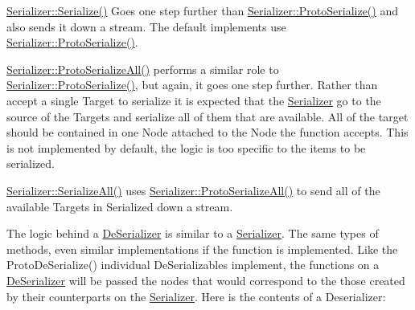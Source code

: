  \par
 \hyperlink{classMezzanine_1_1Serializer_af71f7716c36ba0a583ab1e29e08cac6d}{Serializer\-::\-Serialize()} Goes one step further than \hyperlink{classMezzanine_1_1Serializer_ae20b1167a26fe0d913c9123788d30657}{Serializer\-::\-Proto\-Serialize()} and also sends it down a stream. The default implements use \hyperlink{classMezzanine_1_1Serializer_ae20b1167a26fe0d913c9123788d30657}{Serializer\-::\-Proto\-Serialize()}. \par
 \par
 \hyperlink{classMezzanine_1_1Serializer_addec7bf46f6d1b149eaf3e449c5d8501}{Serializer\-::\-Proto\-Serialize\-All()} performs a similar role to \hyperlink{classMezzanine_1_1Serializer_ae20b1167a26fe0d913c9123788d30657}{Serializer\-::\-Proto\-Serialize()}, but again, it goes one step further. Rather than accept a single Target to serialize it is expected that the \hyperlink{classMezzanine_1_1Serializer}{Serializer} go to the source of the Targets and serialize all of them that are available. All of the target should be contained in one Node attached to the Node the function accepts. This is not implemented by default, the logic is too specific to the items to be serialized. \par
 \par
 \hyperlink{classMezzanine_1_1Serializer_aa178dfa519a2e73e84c0a2f35b2b8b5f}{Serializer\-::\-Serialize\-All()} uses \hyperlink{classMezzanine_1_1Serializer_addec7bf46f6d1b149eaf3e449c5d8501}{Serializer\-::\-Proto\-Serialize\-All()} to send all of the available Targets in Serialized down a stream. \par
 \par
 The logic behind a \hyperlink{classMezzanine_1_1DeSerializer}{De\-Serializer} is similar to a \hyperlink{classMezzanine_1_1Serializer}{Serializer}. The same types of methods, even similar implementations if the function is implemented. Like the Proto\-De\-Serialize() individual De\-Serializables implement, the functions on a \hyperlink{classMezzanine_1_1DeSerializer}{De\-Serializer} will be passed the nodes that would correspond to the those created by their counterparts on the \hyperlink{classMezzanine_1_1Serializer}{Serializer}. Here is the contents of a Deserializer\-: 
